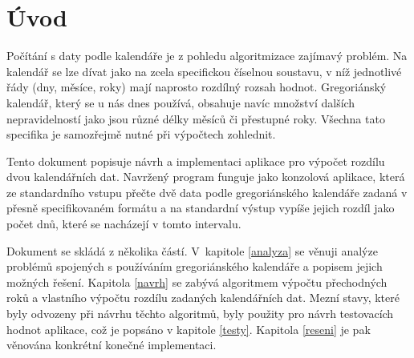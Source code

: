\documentclass[12pt,a4paper,titlepage,final]{article}
\begin{document}

\def\author{Jan Novák}
\def\email{xnovakXX@stud.fit.vutbr.cz}
\def\projname{Iterační výpočty}



\pagestyle{plain}
\setcounter{page}{1}
\tableofcontents

\newpage
\pagestyle{plain}
\setcounter{page}{1}

\section{Úvod} \label{uvod}

Počítání s daty podle kalendáře je z pohledu
algoritmizace zajímavý problém. Na kalendář se lze dívat jako na zcela
specifickou číselnou soustavu, v níž jednotlivé řády (dny, měsíce, roky) mají
naprosto rozdílný rozsah hodnot. Gregoriánský kalendář, který se u nás dnes
používá, obsahuje navíc množství dalších nepravidelností jako jsou různé délky
měsíců či přestupné roky. Všechna tato specifika je samozřejmě nutné při
výpočtech zohlednit.

Tento dokument popisuje návrh a implementaci aplikace pro výpočet rozdílu dvou
kalendářních dat. Navržený program funguje jako konzolová aplikace, která ze
standardního vstupu přečte dvě data podle gregoriánského kalendáře zadaná v
přesně specifikovaném formátu a na standardní výstup vypíše jejich rozdíl jako
počet dnů, které se nacházejí v tomto intervalu.

Dokument se skládá z několika částí. V~kapitole \ref{analyza} se věnuji analýze
problémů spojených s používáním gregoriánského kalendáře a popisem jejich
možných řešení. Kapitola \ref{navrh} se zabývá algoritmem výpočtu přechodných
roků a vlastního výpočtu rozdílu zadaných kalendářních dat. Mezní stavy, které
byly odvozeny při návrhu těchto algoritmů, byly použity pro návrh testovacích
hodnot aplikace, což je popsáno v kapitole \ref{testy}. Kapitola \ref{reseni}
je pak věnována konkrétní konečné implementaci.
\end{document}
